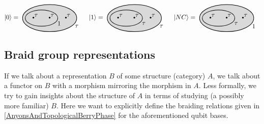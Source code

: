 \documentclass{article}
\begin{document}
\begin{equation*}
  \vert 0 \rangle =
\raisebox{-20pt}{
\begin{tikzpicture}[scale=1.5]
    \fill[gray!30] (3,0) ellipse (1 and 0.5);
    \draw[thick] (3,0) ellipse (1 and 0.5);
    
    \draw[thick] (2.7,0) ellipse (0.6 and 0.3);
    \node at (3.35,-0.2) {$1$};
    \node[scale=2.5] at (2.4, 0) {$\cdot$};
    \node at (2.5,0.1) {$\tau$};
    \node[scale=2.5] at (3.0, 0) {$\cdot$};
    \node at (3.1,0.1) {$\tau$};
    \node[scale=2.5] at (3.6, 0) {$\cdot$};
    \node at (3.7,0.1) {$\tau$};
    \node at (4.0,-0.3) {$\tau$};
\end{tikzpicture}
} 
\quad
\vert 1 \rangle = 
\raisebox{-20pt}{
\begin{tikzpicture}[scale=1.5]    
    \fill[gray!30] (3,0) ellipse (1 and 0.5);
    \draw[thick] (3,0) ellipse (1 and 0.5);
    
    \draw[thick] (2.7,0) ellipse (0.6 and 0.3);
    \node at (3.35,-0.2) {$\tau$};

    \node[scale=2.5] at (2.4, 0) {$\cdot$};
    \node at (2.5,0.1) {$\tau$};
    \node[scale=2.5] at (3.0, 0) {$\cdot$};
    \node at (3.1,0.1) {$\tau$};
    \node[scale=2.5] at (3.6, 0) {$\cdot$};
    \node at (3.7,0.1) {$\tau$};
    \node at (4.0,-0.3) {$\tau$};
\end{tikzpicture}
}
\quad 
\vert NC \rangle =
\raisebox{-20pt}{
\begin{tikzpicture}[scale=1.5]
    \fill[gray!30] (3,0) ellipse (1 and 0.5);
    \draw[thick] (3,0) ellipse (1 and 0.5);
    
    \draw[thick] (2.7,0) ellipse (0.6 and 0.3);
    \node at (3.35,-0.2) {$\tau$};
    \node[scale=2.5] at (2.4, 0) {$\cdot$};
    \node at (2.5, 0.1) {$\tau$};
    \node[scale=2.5] at (3.0, 0) {$\cdot$};
    \node at (3.1,0.1) {$\tau$};
    \node[scale=2.5] at (3.6, 0) {$\cdot$};
    \node at (3.7,0.1) {$\tau$};
    \node at (4.0,-0.3) {$1$};
\end{tikzpicture}
}
\end{equation*}


\subsection{Braid group representations}

If we talk about a representation $B$ of some structure (category) $A$, we talk about a functor on $B$ with a morphism mirroring the morphism in $A$. Less formally, we try to gain insights about the structure of $A$ in terms of studying (a possibly more familiar) $B$. Here we want to explicitly define the braiding relations given in \cref{AnyonsAndTopologicalBerryPhase} for the aforementioned qubit bases. 
\end{document}
